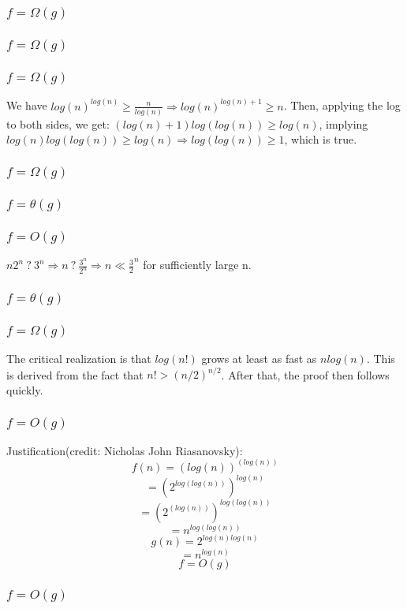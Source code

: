 \documentclass{article}
\begin{document}
\subsubsection{$f = \Omega(g)$}
\subsubsection{$f = \Omega(g)$}
\subsubsection{$f = \Omega(g)$}
We have $log(n)^{log(n)} \geq \frac{n}{log(n)} \Rightarrow log(n)^{log(n) + 1} \geq n$. Then, applying the log to both sides, we get: $(log(n) + 1)log(log(n)) \geq log(n)$, implying $log(n)log(log(n)) \geq log(n) \Rightarrow log(log(n)) \geq 1$, which is true. 
\subsubsection{$f = \Omega(g)$}
\subsubsection{$f = \theta(g)$}
\subsubsection{$f = O(g)$}
$n2^n~?~3^n \Longrightarrow n~?~\frac{3^n}{2^n} \Longrightarrow n \ll \frac{3}{2}^n$ for sufficiently large n.
\subsubsection{$f = \theta(g)$}
\subsubsection{$f = \Omega(g)$}
The critical realization is that $log(n!)$ grows at least as fast as $nlog(n)$. This is derived from the fact that $n! > (n/2)^{n/2}$. After that, the proof then follows quickly. 
\subsubsection{$f = O(g)$}
Justification(credit: Nicholas John Riasanovsky): 
$$f(n)=(log(n))^{(log(n))}$$
$$=(2^{log(log(n))})^{log(n)}$$
$$=(2^{(log(n))})^{log(log(n))}$$
$$=n^{log(log(n))}$$
$$g(n)=2^{log(n)log(n)}$$
$$=n^{log(n)}$$
$$f=O(g)$$
\subsubsection{$f = O(g)$}
\end{document}
